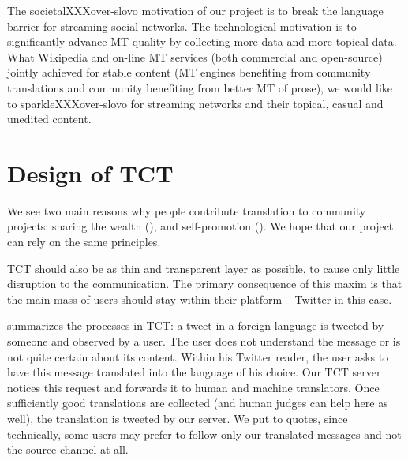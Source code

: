 \documentclass[11pt]{article}
\begin{document}
The societalXXXover-slovo motivation of our project is to break the language
barrier for streaming social networks. The technological motivation is to
significantly advance MT quality by collecting more data and more topical data.
What Wikipedia and on-line MT services (both commercial and open-source) jointly
achieved for stable content (MT engines benefiting from community translations
and community benefiting from better MT of prose),
we would like to sparkleXXXover-slovo for streaming networks and their topical,
casual and unedited content.

\section{Design of TCT}
\label{design}

We see two main reasons why people
contribute translation to community projects: sharing the wealth (), and self-promotion
().
We hope that our project can rely on the same principles.

TCT should also be as thin and transparent layer as possible, to cause only
little disruption to the communication. The primary consequence of this maxim is
that the main mass of users should stay within their platform -- Twitter in this
case.

 summarizes the processes in TCT: a tweet in a foreign language is
tweeted by someone and observed by a user. The user does not understand the
message or is not quite certain about its content. Within his Twitter reader,
the user asks  to have this message translated
into the language of his choice. Our TCT server notices this request and
forwards it to human and machine translators. Once sufficiently good
translations are collected (and human judges can help here as well), the
translation is tweeted  by our server. We put  to quotes,
since technically, some users may prefer to follow only our translated messages
and not the source channel at all.
\end{document}
